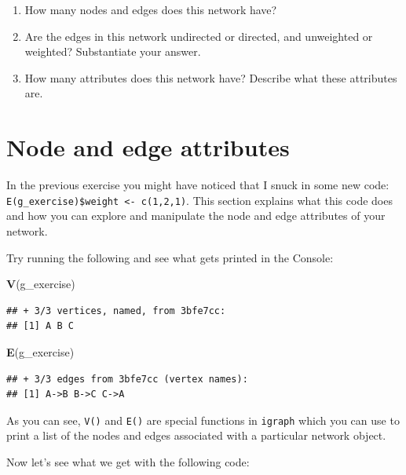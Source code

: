 \documentclass[
]{book}
\newenvironment{Shaded}{\begin{snugshade}}{\end{snugshade}}
\newcommand{\FunctionTok}[1]{\textcolor[rgb]{0.13,0.29,0.53}{\textbf{#1}}}
\newcommand{\NormalTok}[1]{#1}
\providecommand{\tightlist}{%
  \setlength{\itemsep}{0pt}\setlength{\parskip}{0pt}}
\begin{document}
\begin{enumerate}
\def\labelenumi{\arabic{enumi}.}
\tightlist
\item
  How many nodes and edges does this network have?
\item
  Are the edges in this network undirected or directed, and unweighted or weighted? Substantiate your answer.
\item
  How many attributes does this network have? Describe what these attributes are.
\end{enumerate}

\section{Node and edge attributes}\label{node-and-edge-attributes}

In the previous exercise you might have noticed that I snuck in some new code: \texttt{E(g\_exercise)\$weight\ \textless{}-\ c(1,2,1)}. This section explains what this code does and how you can explore and manipulate the node and edge attributes of your network.

Try running the following and see what gets printed in the Console:

\begin{Shaded}
\begin{Highlighting}[]
\FunctionTok{V}\NormalTok{(g\_exercise)}
\end{Highlighting}
\end{Shaded}

\begin{verbatim}
## + 3/3 vertices, named, from 3bfe7cc:
## [1] A B C
\end{verbatim}

\begin{Shaded}
\begin{Highlighting}[]
\FunctionTok{E}\NormalTok{(g\_exercise)}
\end{Highlighting}
\end{Shaded}

\begin{verbatim}
## + 3/3 edges from 3bfe7cc (vertex names):
## [1] A->B B->C C->A
\end{verbatim}

As you can see, \texttt{V()} and \texttt{E()} are special functions in \texttt{igraph} which you can use to print a list of the nodes and edges associated with a particular network object.

Now let's see what we get with the following code:
\end{document}
